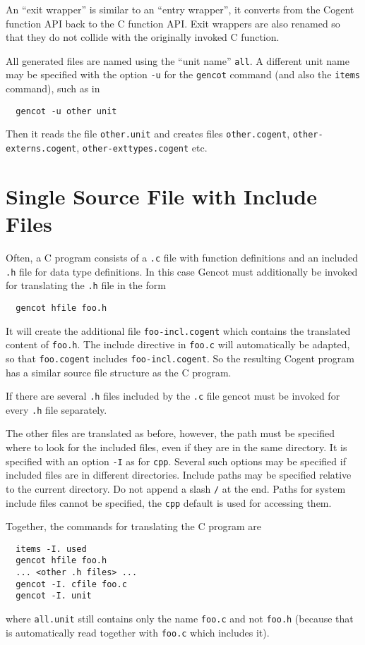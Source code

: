 \documentclass[a4paper]{report}
\newcommand{\code}[1]{\textnormal{\texttt{#1}}}
\begin{document}
An ``exit wrapper'' is similar to an ``entry wrapper'', it converts from the Cogent function API back to the C function API.
Exit wrappers are also renamed so that they do not collide with the originally invoked C function.

All generated files are named using the ``unit name'' \code{all}. A different unit name may be specified with the option 
\code{-u} for the \code{gencot} command (and also the \code{items} command), such as in
\begin{verbatim}
  gencot -u other unit
\end{verbatim}
Then it reads the file \code{other.unit} and creates files \code{other.cogent}, \code{other-externs.cogent}, 
\code{other-exttypes.cogent} etc.

\section{Single Source File with Include Files}
\label{struct-include}

Often, a C program consists of a \code{.c} file with function definitions and an included \code{.h} file for data type 
definitions. In this case Gencot must additionally be invoked for translating the \code{.h} file in the form
\begin{verbatim}
  gencot hfile foo.h
\end{verbatim}
It will create the additional file \code{foo-incl.cogent} which contains the translated content of \code{foo.h}. The 
include directive in \code{foo.c} will automatically be adapted, so that \code{foo.cogent} includes \code{foo-incl.cogent}.
So the resulting Cogent program has a similar source file structure as the C program.

If there are several \code{.h} files included by the \code{.c} file gencot must be invoked for every \code{.h} file
separately.

The other files are translated as before, however, the path must be specified where to look for the included files, even
if they are in the same directory. It is specified with an option \code{-I} as for \code{cpp}. Several such options may 
be specified if included files are in different directories. Include paths may be specified relative to the current 
directory. Do not append a slash \code{/} at the end. Paths for system include files cannot be specified, the \code{cpp} 
default is used for accessing them.

Together, the commands for translating the C program are
\begin{verbatim}
  items -I. used
  gencot hfile foo.h
  ... <other .h files> ...
  gencot -I. cfile foo.c
  gencot -I. unit
\end{verbatim}
where \code{all.unit} still contains only the name \code{foo.c} and not \code{foo.h} (because that is automatically
read together with \code{foo.c} which includes it).
\end{document}
